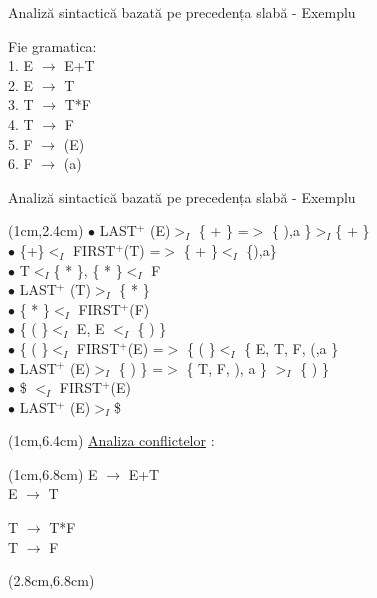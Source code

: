 \documentclass[pdf]{beamer}
\begin{document}
\begin{frame}{Analiză sintactică bazată pe precedența slabă - Exemplu}

Fie gramatica:
\\ 1. E $\rightarrow$ E+T
\\ 2. E $\rightarrow$ T
\\ 3. T $\rightarrow$ T*F
\\ 4. T $\rightarrow$ F
\\ 5. F $\rightarrow$ (E)
\\ 6. F $\rightarrow$ (a)

\end{frame}



\begin{frame}{Analiză sintactică bazată pe precedența slabă - Exemplu}
 \begin{textblock*}{15.8cm}(1cm,2.4cm)
 \footnotesize
$\bullet$ 
LAST$^+$ (E)$>_{I}$ \{ + \} =$>$ \{ ),a \}$>_{I}$\{ + \}
\\ $\bullet$ 
\{+\}$<_{I}$ FIRST$^+$(T) =$>$ \{ + \}$<_{I}$ \{),a\}
\\ $\bullet$ 
T$<_{I}$\{ * \}, \{ * \}$<_{I}$ F
\\ $\bullet$ 
LAST$^+$ (T)$>_{I}$ \{ * \}
\\ $\bullet$ 
\{ * \}$<_{I}$ FIRST$^+$(F)
\\ $\bullet$ 
\{ ( \}$<_{I}$ E, E $<_{I}$ \{ ) \}
\\ $\bullet$ 
\{ ( \}$<_{I}$ FIRST$^+$(E) =$>$ \{ ( \}$<_{I}$ \{ E, T, F, (,a \}
\\ $\bullet$ 
LAST$^+$ (E)$>_{I}$ \{ ) \} =$>$ \{ T, F, ), a \} $>_{I}$ \{ ) \}
\\ $\bullet$ 
\$ $<_{I}$ FIRST$^+$(E)
\\ $\bullet$ 
LAST$^+$ (E)$>_{I}$\$
\end{textblock*}

\begin{textblock*}{15.8cm}(1cm,6.4cm)
\footnotesize
\underline {\color{red} Analiza conflictelor} :
\end{textblock*}

\begin{textblock*}{15.8cm}(1cm,6.8cm)
\scriptsize
E $\rightarrow$ E+T\\
E $\rightarrow$ T

 \hfill

T $\rightarrow$ T*F\\
T $\rightarrow$ F

\end{textblock*}
\begin{textblock*}{15.8cm}(2.8cm,6.8cm)


\end{textblock*}
\end{frame}
\end{document}
